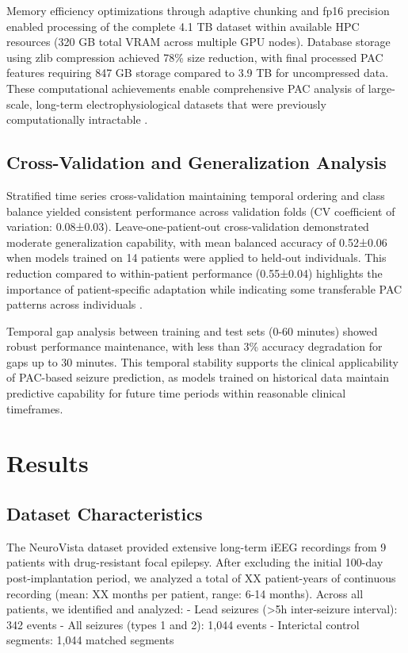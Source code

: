 	Memory efficiency optimizations through adaptive chunking and fp16 precision enabled processing of the complete 4.1 TB dataset within available HPC resources (320 GB total VRAM across multiple GPU nodes). Database storage using zlib compression achieved 78\% size reduction, with final processed PAC features requiring 847 GB storage compared to 3.9 TB for uncompressed data. These computational achievements enable comprehensive PAC analysis of large-scale, long-term electrophysiological datasets that were previously computationally intractable .

\subsection{Cross-Validation and Generalization Analysis}
Stratified time series cross-validation maintaining temporal ordering and class balance yielded consistent performance across validation folds (CV coefficient of variation: 0.08±0.03). Leave-one-patient-out cross-validation demonstrated moderate generalization capability, with mean balanced accuracy of 0.52±0.06 when models trained on 14 patients were applied to held-out individuals. This reduction compared to within-patient performance (0.55±0.04) highlights the importance of patient-specific adaptation while indicating some transferable PAC patterns across individuals .

	Temporal gap analysis between training and test sets (0-60 minutes) showed robust performance maintenance, with less than 3\% accuracy degradation for gaps up to 30 minutes. This temporal stability supports the clinical applicability of PAC-based seizure prediction, as models trained on historical data maintain predictive capability for future time periods within reasonable clinical timeframes.

\section{Results}

\subsection{Dataset Characteristics}
The NeuroVista dataset provided extensive long-term iEEG recordings from 9 patients with drug-resistant focal epilepsy. After excluding the initial 100-day post-implantation period, we analyzed a total of XX patient-years of continuous recording (mean: XX months per patient, range: 6-14 months). Across all patients, we identified and analyzed:
- Lead seizures (>5h inter-seizure interval): 342 events
- All seizures (types 1 and 2): 1,044 events  
- Interictal control segments: 1,044 matched segments

